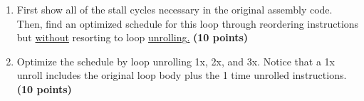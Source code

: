 \documentclass[a4paper, 11pt]{exam}
\begin{document}
\begin{center}
{{{\begin{enumerate}
\begin{enumerate}
	\item First show all of the stall cycles necessary in the original assembly code. Then, find an optimized schedule for this loop through reordering instructions but \underline{without} resorting to loop \underline{unrolling.} \textbf{(10 points)}
	
	\item Optimize the schedule by loop unrolling 1x, 2x, and 3x. Notice that a 1x unroll includes the original loop body plus the 1 time unrolled instructions. \textbf{(10 points)}


\end{enumerate}




\end{enumerate}}}}
\end{center}
\end{document}
